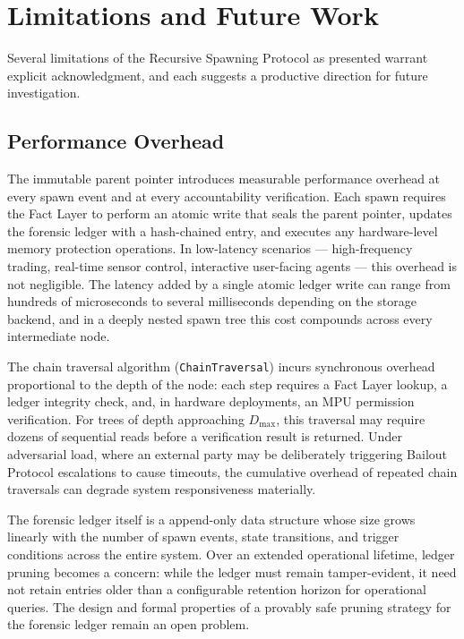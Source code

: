 \section{Limitations and Future Work}
\label{sec:rs-limitations}

Several limitations of the Recursive Spawning Protocol as presented warrant explicit acknowledgment, and each suggests a productive direction for future investigation.

\subsection{Performance Overhead}

The immutable parent pointer introduces measurable performance overhead at every spawn event and at every accountability verification. Each spawn requires the Fact Layer to perform an atomic write that seals the parent pointer, updates the forensic ledger with a hash-chained entry, and executes any hardware-level memory protection operations. In low-latency scenarios --- high-frequency trading, real-time sensor control, interactive user-facing agents --- this overhead is not negligible. The latency added by a single atomic ledger write can range from hundreds of microseconds to several milliseconds depending on the storage backend, and in a deeply nested spawn tree this cost compounds across every intermediate node.

The chain traversal algorithm (\texttt{ChainTraversal}) incurs synchronous overhead proportional to the depth of the node: each step requires a Fact Layer lookup, a ledger integrity check, and, in hardware deployments, an MPU permission verification. For trees of depth approaching $D_{\max}$, this traversal may require dozens of sequential reads before a verification result is returned. Under adversarial load, where an external party may be deliberately triggering Bailout Protocol escalations to cause timeouts, the cumulative overhead of repeated chain traversals can degrade system responsiveness materially.

The forensic ledger itself is a append-only data structure whose size grows linearly with the number of spawn events, state transitions, and trigger conditions across the entire system. Over an extended operational lifetime, ledger pruning becomes a concern: while the ledger must remain tamper-evident, it need not retain entries older than a configurable retention horizon for operational queries. The design and formal properties of a provably safe pruning strategy for the forensic ledger remain an open problem.

